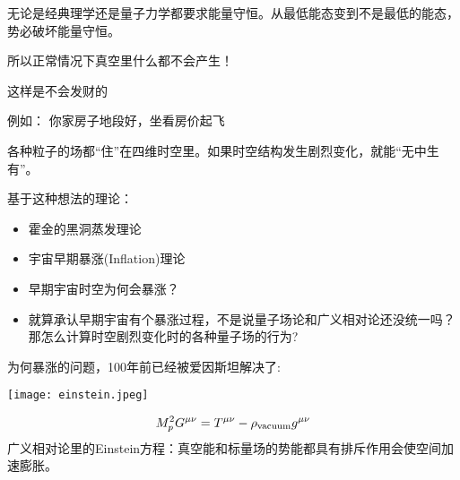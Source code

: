 \documentclass[CJK]{beamer}
\begin{document}
\begin{frame}
\bch

无论是经典理学还是量子力学都要求能量守恒。从最低能态变到不是最低的能态，势必破坏能量守恒。

\skipline
所以正常情况下真空里什么都不会产生！

\ech
\end{frame}

\begin{frame}
\bch


这样是不会发财的

\ech
\end{frame}


\begin{frame}
  \bch
  
  例如： 你家房子地段好，坐看房价起飞
\ech
\end{frame}

\begin{frame}
\bch
各种粒子的场都“住”在四维时空里。如果时空结构发生剧烈变化，就能“无中生有”。

\skipline

基于这种想法的理论：
\begin{itemize}
\item{霍金的黑洞蒸发理论}
\item{宇宙早期暴涨(Inflation)理论}
\end{itemize}
\ech
\end{frame}

\begin{frame}
\bch
\begin{itemize}
\item{早期宇宙时空{\blue \large 为何会暴涨}？}
\item{就算承认早期宇宙有个暴涨过程，不是说量子场论和广义相对论还没统一吗？那{\blue \large 怎么计算}时空剧烈变化时的各种量子场的行为?}
\end{itemize}
\ech
\end{frame}

\begin{frame}
\bch
{\blue 为何暴涨}的问题，100年前已经被{\blue 爱因斯坦解决了}:

\begin{minipage}{0.45\textwidth}
\texttt{[image: einstein.jpeg]}
\end{minipage}
\begin{minipage}{0.45\textwidth}
$$ M_p^2 G^{\mu\nu} =  T^{\mu\nu} - \rho_{\rm vacuum} g^{\mu\nu} $$
广义相对论里的Einstein方程：真空能和标量场的势能都具有排斥作用会使空间加速膨胀。

\end{minipage}
\ech
\end{frame}
\end{document}
